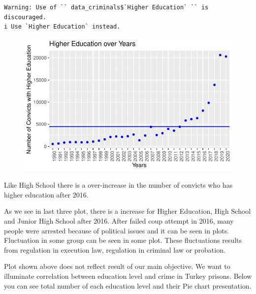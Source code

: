 \documentclass[
  11pt,
  a4paper,
  DIV=11,
  numbers=noendperiod]{scrartcl}
\begin{document}
\begin{verbatim}
Warning: Use of `` data_criminals$`Higher Education` `` is discouraged.
i Use `Higher Education` instead.
\end{verbatim}

\begin{figure}[H]

{\centering \includegraphics{analysis_files/figure-pdf/unnamed-chunk-6-1.pdf}

}

\end{figure}

Like High School there is a over-increase in the number of convicts who
has higher education after 2016.

As we see in last three plot, there is a increase for Higher Education,
High School and Junior High School after 2016. After failed coup attempt
in 2016, many people were arrested because of political issues and it
can be seen in plots. Fluctuation in some group can be seen in some
plot. These fluctuations results from regulation in execution law,
regulation in criminal law or probation.

Plot shown above does not reflect result of our main objective. We want
to illuminate correlation between education level and crime in Turkey
prisons. Below you can see total number of each education level and
their Pie chart presentation.
\end{document}
